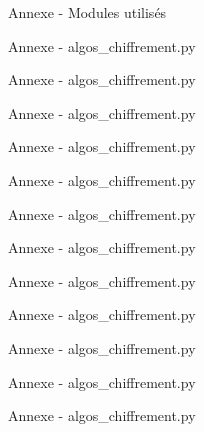 \documentclass{beamer}
\begin{document}
\begin{frame}{Annexe - Modules utilisés}

\end{frame}

\begin{frame}{Annexe - algos\_chiffrement.py}

\end{frame}

\begin{frame}{Annexe - algos\_chiffrement.py}

\end{frame}

\begin{frame}{Annexe - algos\_chiffrement.py}

\end{frame}

\begin{frame}{Annexe - algos\_chiffrement.py}

\end{frame}

\begin{frame}{Annexe - algos\_chiffrement.py}

\end{frame}

\begin{frame}{Annexe - algos\_chiffrement.py}

\end{frame}

\begin{frame}{Annexe - algos\_chiffrement.py}

\end{frame}

\begin{frame}{Annexe - algos\_chiffrement.py}

\end{frame}

\begin{frame}{Annexe - algos\_chiffrement.py}

\end{frame}

\begin{frame}{Annexe - algos\_chiffrement.py}

\end{frame}

\begin{frame}{Annexe - algos\_chiffrement.py}

\end{frame}

\begin{frame}{Annexe - algos\_chiffrement.py}

\end{frame}
\end{document}
